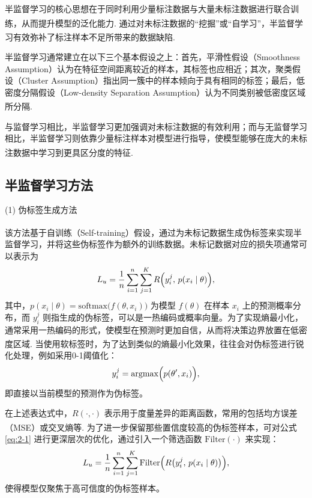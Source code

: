 半监督学习的核心思想在于同时利用少量标注数据与大量未标注数据进行联合训练，从而提升模型的泛化能力\textsuperscript{\cite{van2020survey}}. 通过对未标注数据的“挖掘”或“自学习”，半监督学习有效弥补了标注样本不足所带来的数据缺陷\textsuperscript{\cite{chapelle2009semi}}.

半监督学习通常建立在以下三个基本假设之上：首先，平滑性假设（Smoothness Assumption）认为在特征空间距离较近的样本，其标签也应相近；其次，聚类假设（Cluster Assumption）指出同一簇中的样本倾向于具有相同的标签；最后，低密度分隔假设（Low-density Separation Assumption）认为不同类别被低密度区域所分隔\textsuperscript{\cite{zhu2005semi}}.

与监督学习相比，半监督学习更加强调对未标注数据的有效利用；而与无监督学习相比，半监督学习则依靠少量标注样本对模型进行指导，使模型能够在庞大的未标注数据中学习到更具区分度的特征\textsuperscript{\cite{van2020survey}}.
\subsection{半监督学习方法}

(1) 伪标签生成方法

该方法基于自训练（Self-training）假设\textsuperscript{\cite{lee2013pseudo,zhu2005semi}}，通过为未标记数据生成伪标签来实现半监督学习，并将这些伪标签作为额外的训练数据。未标记数据对应的损失项通常可以表示为
\begin{equation}\label{eq:2-1}
	L_u = \frac{1}{n} \sum_{i=1}^{n} \sum_{j=1}^{K} R \Bigl( y_i^{j}, \, p(x_i \mid \theta) \Bigr),
\end{equation}
其中，$ p(x_i \mid \theta) = \mathrm{softmax}\bigl(f(\theta, x_i)\bigr) $ 为模型 $ f(\theta) $ 在样本 $ x_i $ 上的预测概率分布，而 $ y_i^{j} $ 则指生成的伪标签，可以是一热编码或概率向量。为了实现熵最小化，通常采用一热编码的形式，使模型在预测时更加自信，从而将决策边界放置在低密度区域\textsuperscript{\cite{chapelle2009semi}}. 当使用软标签时，为了达到类似的熵最小化效果，往往会对伪标签进行锐化处理，例如采用0-1阈值化：
\begin{equation}\label{eq:2-2}
	y_i^{j} = \mathrm{argmax}\Bigl(p(\theta', x_i)\Bigr),
\end{equation}
即直接以当前模型的预测作为伪标签。

在上述表达式中，$ R(\cdot, \cdot) $ 表示用于度量差异的距离函数，常用的包括均方误差（MSE）或交叉熵等\textsuperscript{\cite{van2020survey}}. 为了进一步保留那些置信度较高的伪标签样本，可对公式 \eqref{eq:2-1} 进行更深层次的优化，通过引入一个筛选函数 $\mathrm{Filter}(\cdot)$ 来实现：
\begin{equation}\label{eq:2-3}
	L_u = \frac{1}{n} \sum_{i=1}^{n} \sum_{j=1}^{K} 
	\mathrm{Filter} \Bigl( R \bigl( y_i^{j},\, p(x_i \mid \theta) \bigr) \Bigr),
\end{equation}
使得模型仅聚焦于高可信度的伪标签样本。

